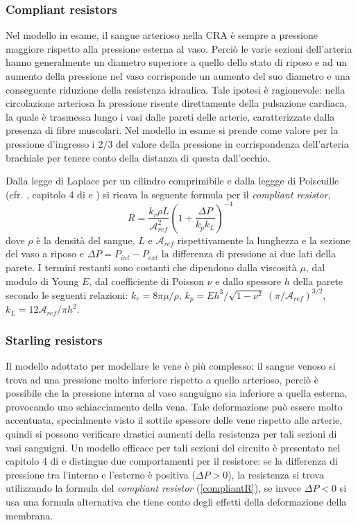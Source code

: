 \documentclass{article}
\begin{document}
\subsubsection*{Compliant resistors}
Nel modello in esame, il sangue arterioso nella CRA è sempre a pressione maggiore rispetto alla pressione esterna al vaso.
Perciò le varie sezioni dell'arteria hanno generalmente un diametro superiore a quello dello stato di riposo e ad un aumento della pressione nel vaso corrisponde un aumento del suo diametro e una conseguente riduzione della resistenza idraulica.
Tale ipotesi è ragionevole: nella circolazione arteriosa la pressione risente direttamente della pulsazione cardiaca, la quale è trasmessa lungo i vasi dalle pareti delle arterie, caratterizzate dalla presenza di fibre muscolari.
Nel modello in esame si prende come valore per la pressione d'ingresso  i $2/3$ del valore della pressione in corrispondenza dell'arteria brachiale per tenere conto della distanza di questa dall'occhio.

Dalla legge di Laplace per un cilindro comprimibile e dalla leggge di Poiseuille (cfr. \cite{art1}, capitolo 4 di \cite{notes} e \cite{Libro}) si ricava la seguente formula per il \textit{compliant resistor},
\begin{equation}
R = \frac{k_r \rho L}{\mathcal{A}_{ref}^2}\left( 1 + \frac{\Delta P}{k_p k_L}\right)^{-4}
\label{compliantR}
\end{equation}
dove $\rho$ è la densità del sangue, $L$ e $\mathcal{A}_{ref}$ rispettivamente la lunghezza e la sezione del vaso a riposo e $\Delta P = P_{int} - P_{ext}$ la differenza di pressione ai due lati della parete.
I termini restanti sono costanti che dipendono dalla viscosità $\mu$, dal modulo di Young $E$, dal coefficiente di Poisson $\nu$ e dallo spessore $h$ della parete secondo le seguenti relazioni: $k_r = 8 \pi \mu / \rho$, $k_p = E h^3 / \sqrt{1 - \nu^2}\  (\pi/\mathcal{A}_{ref})^{3/2}$, $k_L = 12 \mathcal{A}_{ref} / \pi h^2$.
\subsubsection*{Starling resistors}
Il modello adottato per modellare le vene è più complesso: il sangue venoso si trova ad una pressione molto inferiore rispetto a quello arterioso, perciò è possibile che la pressione interna al vaso sanguigno sia inferiore a quella esterna, provocando uno schiacciamento della vena.
Tale deformazione può essere molto accentuata, specialmente visto il sottile spessore delle vene rispetto alle arterie, quindi si possono verificare drastici aumenti della resistenza per tali sezioni di vasi sanguigni.
Un modello efficace per tali sezioni del circuito è presentato nel capitolo 4 di \cite{notes} e distingue due comportamenti per il resistore: se la differenza di pressione tra l'interno e l'esterno è positiva ($\Delta P > 0$), la resistenza si trova utilizzando la formula del \textit{compliant resistor} (\ref{compliantR}), se invece $\Delta P < 0$ si usa una formula alternativa che tiene conto degli effetti della deformazione della membrana.
\end{document}
